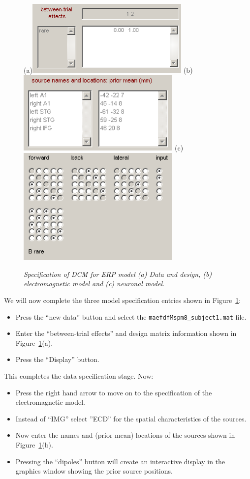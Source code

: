 \begin{figure}
\begin{center}
(a)\includegraphics[width=80mm]{mmn/data_and_design}
(b)\includegraphics[width=80mm]{mmn/electro_model}
(c)\includegraphics[width=80mm]{mmn/neuronal_model}
\caption{\em Specification of DCM for ERP model (a) Data and design, (b) electromagnetic model and (c) neuronal model.
\label{specify} }
\end{center}
\end{figure}
We will now complete the three model specification entries shown in Figure~\ref{specify}:
\begin{itemize}
\item{Press the ``new data'' button and select the \texttt{maefdfMspm8\_subject1.mat} file.}
\item{Enter the ``between-trial effects'' and design matrix information shown in Figure~\ref{specify}(a).}
\item{Press the ``Display'' button.}
\end{itemize}
This completes the data specification stage. Now:
\begin{itemize}
\item{Press the right hand arrow to move on to the specification of the electromagnetic model.}
\item{Instead of ``IMG'' select ''ECD'' for the spatial characteristics of the sources.}
\item{Now enter the names and (prior mean) locations of the sources shown in Figure~\ref{specify}(b).}
\item{Pressing the ``dipoles'' button will create an interactive display in the graphics window showing the prior source positions.}
\end{itemize}
